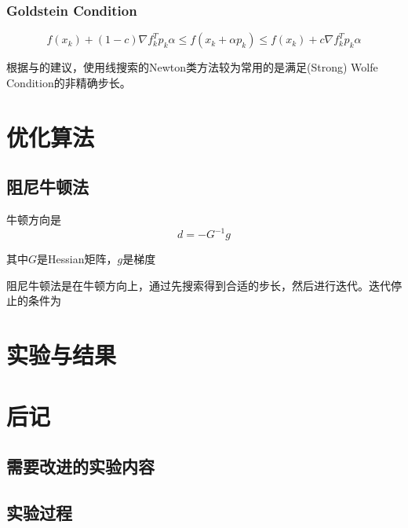 \documentclass[11pt, a4paper]{article}
\begin{document}
\subsubsection{Goldstein Condition}
\[f(x_k)+(1-c)\nabla f_k^Tp_k\alpha \le f(x_k+\alpha p_k)\le f(x_k)+c\nabla f_k^T p_k\alpha\]


根据\cite{shanno1970conditioning}与\cite{ZHANG2001269}的建议，使用线搜索的Newton类方法较为常用的是满足(Strong) Wolfe Condition的非精确步长。

\section{优化算法}

\subsection{阻尼牛顿法}

牛顿方向是\[d=-G^{-1}g\]

其中$G$是Hessian矩阵，$g$是梯度

阻尼牛顿法是在牛顿方向上，通过先搜索得到合适的步长，然后进行迭代。迭代停止的条件为
\section{实验与结果}
\section{后记}
\subsection{需要改进的实验内容}
\subsection{实验过程}

\newpage
{}


\end{document}
